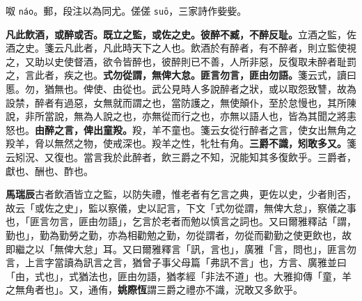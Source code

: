 \begin{quoting}呶 \texttt{náo}。郵，段注以為同尤。傞傞 \texttt{suō}，三家詩作姕姕。\end{quoting}

\textbf{凡此飲酒，或醉或否。既立之監，或佐之史。彼醉不臧，不醉反耻。}{\footnotesize 立酒之監，佐酒之史。箋云凡此者，凡此時天下之人也。飲酒於有醉者，有不醉者，則立監使視之，又助以史使督酒，欲令皆醉也，彼醉則已不善，人所非惡，反復取未醉者耻罰之，言此者，疾之也。}\textbf{式勿從謂，無俾大怠。匪言勿言，匪由勿語。}{\footnotesize 箋云式，讀曰慝。勿，猶無也。俾使、由從也。武公見時人多說醉者之狀，或以取怨致讐，故為設禁，醉者有過惡，女無就而謂之也，當防護之，無使顛仆，至於怠慢也，其所陳說，非所當說，無為人說之也，亦無從而行之也，亦無以語人也，皆為其聞之將恚怒也。}\textbf{由醉之言，俾出童羖。}{\footnotesize 羖，羊不童也。箋云女從行醉者之言，使女出無角之羖羊，脅以無然之物，使戒深也。羖羊之性，牝牡有角。}\textbf{三爵不識，矧敢多又。}{\footnotesize 箋云矧況、又復也。當言我於此醉者，飲三爵之不知，況能知其多復飲乎。三爵者，獻也、酬也、酢也。}

\begin{quoting}\textbf{馬瑞辰}古者飲酒皆立之監，以防失禮，惟老者有乞言之典，更佐以史，少者則否，故云「或佐之史」，監以察儀，史以記言，下文「式勿從謂，無俾大怠」，察儀之事也，「匪言勿言，匪由勿語」，乞言於老者而勉以慎言之詞也。又曰爾雅釋詁「謂，勤也」，勤為勤勞之勤，亦為相勸勉之勤，勿從謂者，勿從而勸勤之使更飲也，故即繼之以「無俾大怠」耳。又曰爾雅釋言「訊，言也」，廣雅「言，問也」，匪言勿言，上言字當讀為訊言之言，猶曾子事父母篇「弗訊不言」也，方言、廣雅並曰「由，式也」，式猶法也，匪由勿語，猶孝經「非法不道」也。大雅抑傳「童，羊之無角者也」。又，通侑，\textbf{姚際恆}謂三爵之禮亦不識，況敢又多飲乎。\end{quoting}

